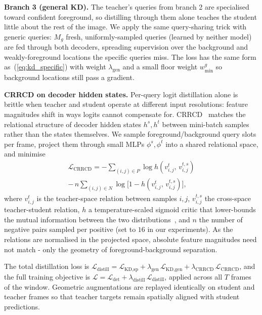 \documentclass[conference]{IEEEtran}
\begin{document}
\textbf{Branch 3 (general KD).} The teacher's queries from branch 2 are specialised toward confident foreground, so distilling through them alone teaches the student little about the rest of the image. We apply the same query-sharing trick with generic queries: $M_g$ fresh, uniformly-sampled queries (learned by neither model) are fed through both decoders, spreading supervision over the background and weakly-foreground locations the specific queries miss. The loss has the same form as~(\ref{eq:kd_specific}) with weight $\lambda_{\text{gen}}$ and a small floor weight $w^{g}_{\min}$ so background locations still pass a gradient.

\textbf{CRRCD on decoder hidden states.} Per-query logit distillation alone is brittle when teacher and student operate at different input resolutions: feature magnitudes shift in ways logits cannot compensate for. CRRCD~\cite{zhang2024crrcd} matches the relational structure of decoder hidden states $h^{s}, h^{t}$ between mini-batch samples rather than the states themselves. We sample foreground/background query slots per frame, project them through small MLPs $\phi^{s}, \phi^{t}$ into a shared relational space, and minimise
\begin{multline}
\mathcal{L}_{\text{CRRCD}} = -\!\!\sum_{(i,j)\in P}\!\! \log h(v^{t}_{i,j},\, v^{t,s}_{i,j}) \\
   -\, n\!\!\sum_{(i,j)\in N}\!\! \log\big[1 - h(v^{t}_{i,j},\, v^{t,s}_{i,j})\big],
\label{eq:crrcd}
\end{multline}
where $v^{t}_{i,j}$ is the teacher-space relation between samples $i,j$, $v^{t,s}_{i,j}$ the cross-space teacher-student relation, $h$ a temperature-scaled sigmoid critic that lower-bounds the mutual information between the two distributions~\cite{zhang2024crrcd}, and $n$ the number of negative pairs sampled per positive (set to $16$ in our experiments). As the relations are normalised in the projected space, absolute feature magnitudes need not match - only the geometry of foreground-background separation.

The total distillation loss is $\mathcal{L}_{\text{distill}} = \mathcal{L}_{\text{KD,sp}} + \lambda_{\text{gen}}\,\mathcal{L}_{\text{KD,gen}} + \lambda_{\text{CRRCD}}\,\mathcal{L}_{\text{CRRCD}}$, and the full training objective is $\mathcal{L} = \mathcal{L}_{\text{det}} + \lambda_{\text{distill}}\,\mathcal{L}_{\text{distill}}$, applied across all $T$ frames of the window. Geometric augmentations are replayed identically on student and teacher frames so that teacher targets remain spatially aligned with student predictions.
\end{document}
